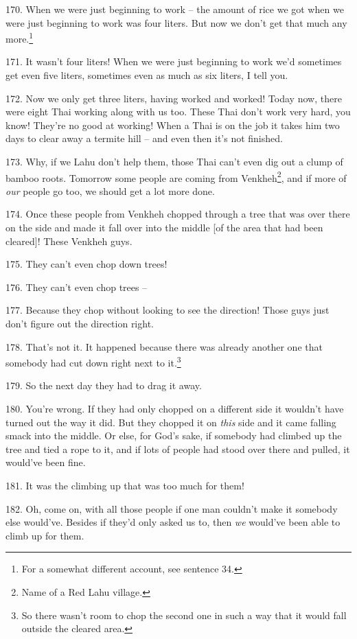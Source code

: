 170. When we were just beginning to work -- the amount of rice we got when we were
just beginning to work was four liters. But now we don't get that much any more.\footnote{For a somewhat different account, see sentence 34.}

171. It wasn't four liters! When we were just beginning to work we'd sometimes
get even five liters, sometimes even as much as six liters, I tell you.

172. Now we only get three liters, having worked and worked! Today now, there were
eight Thai working along with us too. These Thai don't work very hard, you know!
They're no good at working! When a Thai is on the job it takes him two days to
clear away a termite hill -- and even then it's not finished.

173. Why, if we Lahu don't help them, those Thai can't even dig out a clump of
bamboo roots. Tomorrow some people are coming from Venkheh\footnote{Name of a Red Lahu village.}, and if more of
\textit{our} people go too, we should get a lot more done.

174. Once these people from Venkheh chopped through a tree that was over there
on the side and made it fall over into the middle [of the area that had been cleared]!
These Venkheh guys.

175. They can't even chop down trees!

176. They can't even chop trees --

177. Because they chop without looking to see the direction! Those guys just don't
figure out the direction right.

178.  That's not it. It happened because there
was already another one that somebody had cut down right next to it.\footnote{So there wasn't room to chop the second one in such a way that it would fall outside the cleared area.}

179. So the next day they had to drag it away.

180. You're wrong. If they had only chopped on a different side it wouldn't have
turned out the way it did. But they chopped it on \textit{this} side 
and it came falling smack into the middle. Or else, for God's sake, if somebody
had climbed up the tree and tied a rope to it, and if lots of people had stood
over there and pulled, it would've been fine.

181. It was the climbing up that was too much for them!

182. Oh, come on, with all those people if one man couldn't make it somebody else
would've. Besides if they'd only asked us to, then \textit{we} would've been able
to climb up for them.

